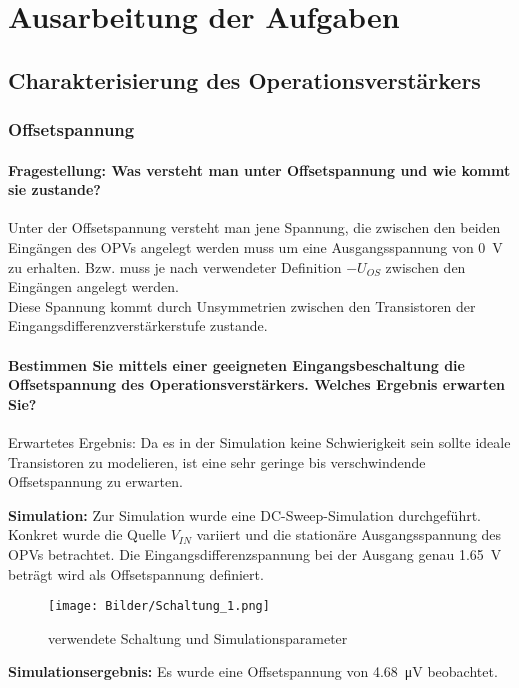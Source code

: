 \chapter{Ausarbeitung der Aufgaben}
\section{Charakterisierung des Operationsverstärkers}
\subsection{Offsetspannung}
\subsubsection{Fragestellung: Was versteht man unter Offsetspannung und wie kommt sie zustande?}

Unter der Offsetspannung versteht man jene Spannung, die zwischen den beiden Eingängen des OPVs angelegt werden muss um eine Ausgangsspannung von \SI{0}{\volt} zu erhalten. Bzw. muss je nach verwendeter Definition $-U_{OS}$ zwischen den Eingängen angelegt werden.\\

Diese Spannung kommt durch Unsymmetrien zwischen den Transistoren der Eingangsdifferenzverstärkerstufe zustande.

\subsubsection{Bestimmen Sie mittels einer geeigneten Eingangsbeschaltung die Offsetspannung des Operationsverstärkers. Welches Ergebnis erwarten Sie?}

Erwartetes Ergebnis: Da es in der Simulation keine Schwierigkeit sein sollte ideale Transistoren zu modelieren, ist eine sehr geringe bis verschwindende Offsetspannung zu erwarten.

\textbf{Simulation:}
Zur Simulation wurde eine DC-Sweep-Simulation durchgeführt. Konkret wurde die Quelle $V_{IN}$ variiert und die stationäre Ausgangsspannung des OPVs betrachtet. Die Eingangsdifferenzspannung bei der Ausgang genau \SI{1.65}{\volt} beträgt wird als Offsetspannung definiert.
\begin{figure}[H]
    \centering
    \texttt{[image: Bilder/Schaltung\_1.png]}
    \caption{verwendete Schaltung und Simulationsparameter}
    \label{fig:my_label}
\end{figure}

\textbf{Simulationsergebnis:} Es wurde eine Offsetspannung von \SI{4.68}{\micro \volt} beobachtet.


